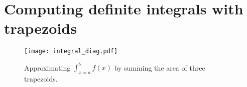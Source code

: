 \documentclass{tmr}
\begin{document}




\section{Computing definite integrals with trapezoids}

\begin{figure}[t]
\centering
\texttt{[image: integral\_diag.pdf]}
\caption{Approximating $\int_{x=a}^{b} f(x)$ by summing the area of three trapezoids.
\label{trapezoidfig}}
\end{figure}
\end{document}
